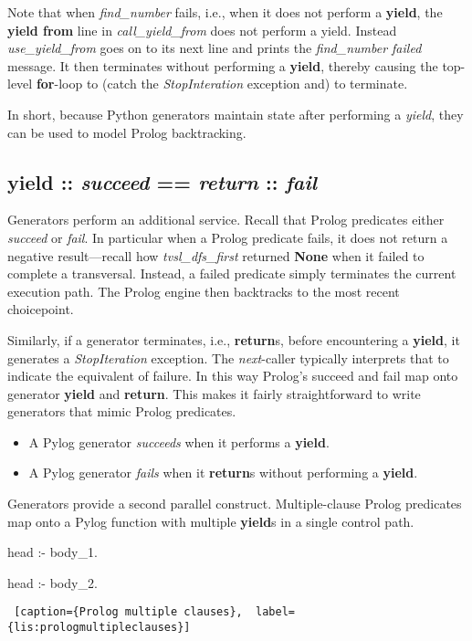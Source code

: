 Note that when \textit{find\_number} fails, i.e., when it does not perform a \textbf{yield}, the \textbf{yield from} line in \textit{call\_yield\_from} does not perform a yield. Instead \textit{use\_yield\_from} goes on to its next line and prints the \textit{find\_number failed} message. It then terminates without performing a \textbf{yield}, thereby causing the top-level \textbf{for}-loop to (catch the \textit{StopInteration} exception and) to terminate. 

In short, because Python generators maintain state after performing a \textit{yield}, they can be used to model Prolog backtracking.

\subsection{\textbf{yield} :: \textit{succeed} == \textit{return} :: \textit{fail}}
Generators perform an additional service. Recall that Prolog predicates either \textit{succeed} or \textit{fail}. In particular when a Prolog predicate fails, it does not return a negative result---recall how \textit{tvsl\_dfs\_first} returned \textbf{None} when it failed to complete a transversal. Instead, a failed predicate simply terminates the current execution path. The Prolog engine then backtracks to the most recent choicepoint.

Similarly, if a generator terminates, i.e., \textbf{return}s, before encountering a \textbf{yield}, it generates a \textit{StopIteration} exception. The \textit{next}-caller typically interprets that to indicate the equivalent of failure. In this way Prolog's succeed and fail map onto generator \textbf{yield} and \textbf{return}. This makes it fairly straightforward to write generators that mimic Prolog predicates.

\begin{itemize}
    \item A Pylog generator \textit{succeeds} when it performs a \textbf{yield}. 
    \item A Pylog generator \textit{fails} when it \textbf{return}s without performing a \textbf{yield}. 
\end{itemize}

Generators provide a second parallel construct. Multiple-clause Prolog predicates map onto a Pylog function with multiple \textbf{yield}s in a single control path.

\begin{minipage}{\linewidth}  \largev  \hrulefill  
\begin{python}
head :- body_1.

head :- body_2.
\end{python}
\begin{lstlisting} [caption={Prolog multiple clauses},  label={lis:prologmultipleclauses}]
\end{lstlisting}
\end{minipage}


